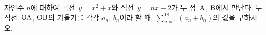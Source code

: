 \hspace*{2mm}\begin{minipage}[t]{\dimexpr\linewidth-2mm\relax}\vspace{0pt}
자연수 $n$에 대하여 곡선~$y=x^2+x$와 직선~$y=nx+2$가 두 점~$\mathrm{A}$, $\mathrm{B}$에서 만난다. 두 직선~$\mathrm{OA}$, $\mathrm{OB}$의 기울기를 각각 $a_n$, $b_n$이라 할 때, $\displaystyle\sum_{n=1}^{18}(a_n+b_n)$의 값을 구하시오. \end{minipage}
